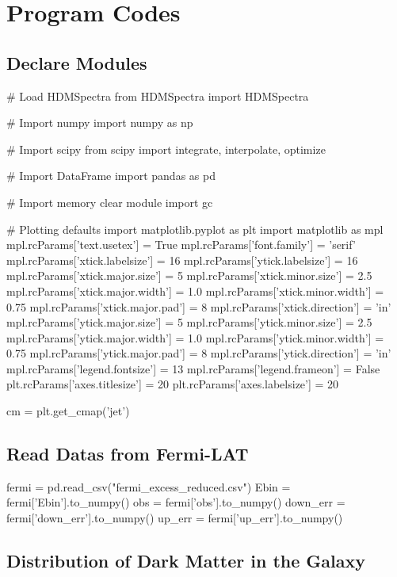 \documentclass[10pt, oneside]{book}
\numberwithin{equation}{chapter}
\begin{document}
\chapter{Program Codes}
\section{Declare Modules}
\begin{python}
# Load HDMSpectra
from HDMSpectra import HDMSpectra

# Import numpy
import numpy as np

# Import scipy
from scipy import integrate, interpolate, optimize


# Import DataFrame
import pandas as pd

# Import memory clear module
import gc


# Plotting defaults
import matplotlib.pyplot as plt
import matplotlib as mpl
mpl.rcParams['text.usetex'] = True
mpl.rcParams['font.family'] = 'serif'
mpl.rcParams['xtick.labelsize'] = 16
mpl.rcParams['ytick.labelsize'] = 16
mpl.rcParams['xtick.major.size'] = 5
mpl.rcParams['xtick.minor.size'] = 2.5
mpl.rcParams['xtick.major.width'] = 1.0
mpl.rcParams['xtick.minor.width'] = 0.75
mpl.rcParams['xtick.major.pad'] = 8
mpl.rcParams['xtick.direction'] = 'in'
mpl.rcParams['ytick.major.size'] = 5
mpl.rcParams['ytick.minor.size'] = 2.5
mpl.rcParams['ytick.major.width'] = 1.0
mpl.rcParams['ytick.minor.width'] = 0.75
mpl.rcParams['ytick.major.pad'] = 8
mpl.rcParams['ytick.direction'] = 'in'
mpl.rcParams['legend.fontsize'] = 13
mpl.rcParams['legend.frameon'] = False
plt.rcParams['axes.titlesize'] = 20
plt.rcParams['axes.labelsize'] = 20

cm = plt.get_cmap('jet')
\end{python}

\section{Read Datas from Fermi-LAT}
\begin{python}
fermi = pd.read_csv("fermi_excess_reduced.csv")
Ebin = fermi['Ebin'].to_numpy()
obs = fermi['obs'].to_numpy()
down_err = fermi['down_err'].to_numpy()
up_err = fermi['up_err'].to_numpy()
\end{python}

\section{Distribution of Dark Matter in the Galaxy}
\end{document}
